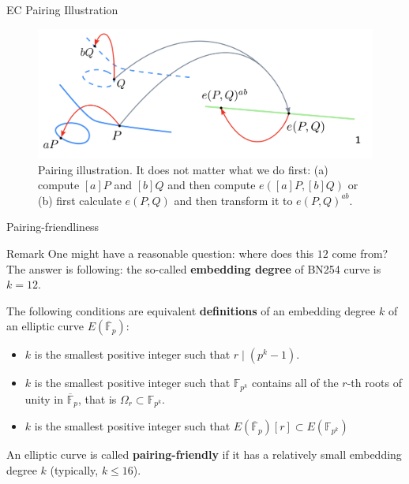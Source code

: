 \documentclass[xcolor={usenames,dvipsnames}]{beamer}
\begin{document}
    \begin{frame}{EC Pairing Illustration}
        \begin{figure}
            \centering
            \includegraphics[width=\textwidth]{images/lecture_4/pairing.png}
            \caption{Pairing illustration. It does not matter what we do first: (a) compute $[a]P$ and $[b]Q$ and then compute $e([a]P,[b]Q)$ or (b) first calculate $e(P,Q)$ and then transform it to $e(P,Q)^{ab}$.}
        \end{figure}
    \end{frame}

    \begin{frame}{Pairing-friendliness}
        \begin{block}{Remark}
            One might have a reasonable question: where does this $12$ come from? The answer is following: the so-called \textbf{embedding degree} of BN254 curve is $k=12$.
        \end{block}
        
        \pause\begin{definition}
            The following conditions are equivalent \textbf{definitions} of an embedding degree $k$ of an elliptic curve $E(\overline{\mathbb{F}}_p)$:
            \begin{itemize}
                \item \pause$k$ is the smallest positive integer such that $r \mid (p^k-1)$.
                \item \pause$k$ is the smallest positive integer such that $\mathbb{F}_{p^k}$ contains all of the $r$-th roots of unity in $\overline{\mathbb{F}}_p$, that is $\Omega_r \subset \mathbb{F}_{p^k}$.
                \item \pause$k$ is the smallest positive integer such that $E(\overline{\mathbb{F}}_p)[r] \subset E(\mathbb{F}_{p^k})$
            \end{itemize}
            \pause An elliptic curve is called \textbf{pairing-friendly} if it has a relatively small embedding degree $k$ (typically, $k \leq 16$).
        \end{definition}
    \end{frame}
\end{document}

